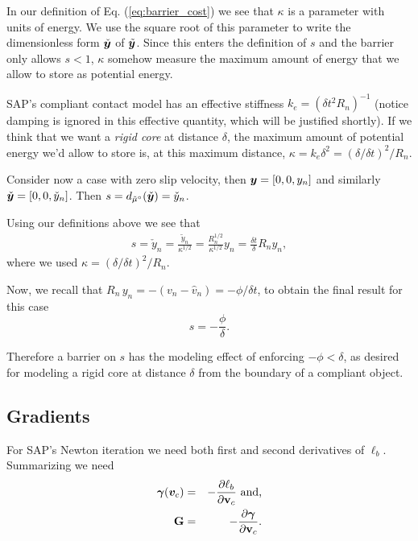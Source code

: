 In our definition of Eq. (\ref{eq:barrier_cost}) we see that $\kappa$ is a
parameter with units of energy. We use the square root of this parameter to
write the dimensionless form $\check{{\bm{y}}}$ of $\tilde{{\bm{y}}}$. Since this
enters the definition of $s$ and the barrier only allows $s < 1$, $\kappa$
somehow measure the maximum amount of energy that we allow to store as potential
energy.

SAP's compliant contact model has an effective stiffness $k_e = (\delta t^2
R_n)^{-1}$ (notice damping is ignored in this effective quantity, which will be
justified shortly). If we think that we want a \textit{rigid core} at distance
$\delta$, the maximum amount of potential energy we'd allow to store is, at this
maximum distance, $\kappa = k_e\delta^2 = (\delta/\delta t)^2/R_n$.

Consider now a case with zero slip velocity, then ${\bm{y}}=[0, 0, y_n]$ and
similarly $\check{{\bm{y}}}=[0, 0, \check{y}_n]$. Then
$s=d_{\tilde{\mu}^\circ}(\check{{\bm{y}}})= \check{y}_n$.

Using our definitions above we see that
\begin{eqnarray}
    s = \check{y}_n =
    \frac{\tilde{y}_n}{\kappa^{1/2}}=\frac{R_n^{1/2}}{\kappa^{1/2}}y_n=\frac{\delta
    t}{\delta}R_n y_n,
\end{eqnarray}
where we used $\kappa = (\delta/\delta t)^2/R_n$.

Now, we recall that $R_n\,y_n = -(v_n-\hat{v}_n) = -\phi/\delta t$, to obtain
the final result for this case
\begin{equation}
    s = -\frac{\phi}{\delta}.
\end{equation}

Therefore a barrier on $s$ has the modeling effect of enforcing $-\phi <
\delta$, as desired for modeling a rigid core at distance $\delta$ from the
boundary of a compliant object.

\subsection{Gradients}

For SAP's Newton iteration we need both first and second derivatives of
$\ell_b$. Summarizing we need
\begin{eqnarray}
    \bgamma(\vf{v}_c) &=& -\frac{\partial\ell_b}{\partial\mf{v}_c}\text{ and,}
    \label{eq:gamma_from_barrier}\\
    \mf{G}&=& -\frac{\partial\bgamma}{\partial\mf{v}_c}.
\end{eqnarray}

